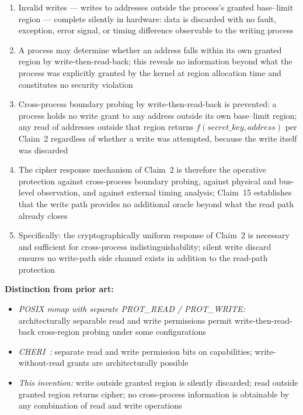 \documentclass[12pt,letterpaper]{article}
\begin{document}
\begin{enumerate}[label=(\alph*),noitemsep]
  \item Invalid writes --- writes to addresses outside the process's
        granted base--limit region --- complete silently in hardware:
        data is discarded with no fault, exception, error signal, or
        timing difference observable to the writing process

  \item A process may determine whether an address falls within its
        own granted region by write-then-read-back; this reveals no
        information beyond what the process was explicitly granted by
        the kernel at region allocation time and constitutes no
        security violation

  \item Cross-process boundary probing by write-then-read-back is
        prevented: a process holds no write grant to any address
        outside its own base--limit region; any read of addresses
        outside that region returns $f(\textit{secret\_key},
        \textit{address})$ per Claim~2 regardless of whether a
        write was attempted, because the write itself was discarded

  \item The cipher response mechanism of Claim~2 is therefore the
        operative protection against cross-process boundary probing,
        against physical and bus-level observation, and against
        external timing analysis; Claim~15 establishes that the write
        path provides no additional oracle beyond what the read path
        already closes

  \item Specifically: the cryptographically uniform response of
        Claim~2 is necessary and sufficient for cross-process
        indistinguishability; silent write discard ensures no
        write-path side channel exists in addition to the read-path
        protection
\end{enumerate}

\textbf{Distinction from prior art:}
\begin{itemize}[noitemsep]
  \item \textit{POSIX mmap with separate PROT\_READ / PROT\_WRITE:}
        architecturally separable read and write permissions permit
        write-then-read-back cross-region probing under some
        configurations

  \item \textit{CHERI~\cite{cheri_isca}:} separate read and write
        permission bits on capabilities; write-without-read grants
        are architecturally possible

  \item \textit{This invention:} write outside granted region is
        silently discarded; read outside granted region returns
        cipher; no cross-process information is obtainable by any
        combination of read and write operations
\end{itemize}
\end{document}
